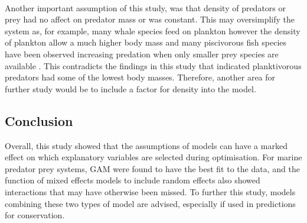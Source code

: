 \documentclass[11pt,a4paper]{article}
\begin{document}
	\par \noindent ~\\ Another important assumption of this study, was that density of predators or prey had no affect on predator mass or was constant. This may oversimplify the system as, for example, many whale species feed on plankton however the density of plankton allow a much higher body mass and many piscivorous fish species have been observed increasing predation when only smaller prey species are available \citep{Vezina1985}. This contradicts the findings in this study that indicated planktivorous predators had some of the lowest body masses. Therefore, another area for further study would be to include a factor for density into the model.
	
	\subsection{Conclusion}	
	
	\par \noindent Overall, this study showed that the assumptions of models can have a marked effect on which explanatory variables are selected during optimisation. For marine predator prey systems, GAM were found to have the best fit to the data, and the function of mixed effects models to include random effects also showed interactions that may have otherwise been missed. To further this study, models combining these two types of model are advised, especially if used in predictions for conservation.
	
	
	
	
\end{document}
